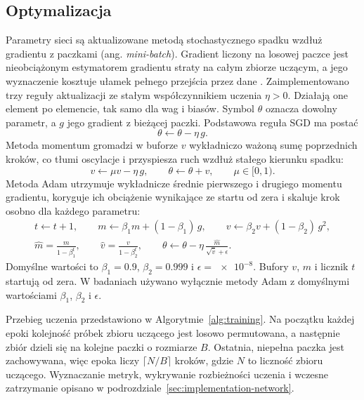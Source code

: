 \subsection{Optymalizacja}
\label{sec:mlp-optimization}

Parametry sieci są aktualizowane metodą stochastycznego spadku wzdłuż gradientu z paczkami (ang. \textit{mini-batch}). Gradient liczony na losowej paczce jest nieobciążonym estymatorem gradientu straty na całym zbiorze uczącym, a jego wyznaczenie kosztuje ułamek pełnego przejścia przez dane \cite{goodfellow2016}. Zaimplementowano trzy reguły aktualizacji ze stałym współczynnikiem uczenia $\eta > 0$. Działają one element po elemencie, tak samo dla wag i biasów. Symbol $\theta$ oznacza dowolny parametr, a $g$ jego gradient z bieżącej paczki. Podstawowa reguła SGD ma postać
\begin{equation}
    \theta \gets \theta - \eta \, g .
    \label{eq:sgd}
\end{equation}
Metoda momentum \cite{sutskever2013} gromadzi w buforze $v$ wykładniczo ważoną sumę poprzednich kroków, co tłumi oscylacje i przyspiesza ruch wzdłuż stałego kierunku spadku:
\begin{equation}
    v \gets \mu v - \eta \, g, \qquad \theta \gets \theta + v, \qquad \mu \in [0, 1).
    \label{eq:momentum}
\end{equation}
Metoda Adam \cite{kingma2015} utrzymuje wykładnicze średnie pierwszego i drugiego momentu gradientu, koryguje ich obciążenie wynikające ze startu od zera i skaluje krok osobno dla każdego parametru:
\begin{equation}
    \begin{gathered}
        t \gets t + 1, \qquad
        m \gets \beta_1 m + (1 - \beta_1) \, g, \qquad
        v \gets \beta_2 v + (1 - \beta_2) \, g^2, \\
        \hat{m} = \frac{m}{1 - \beta_1^{t}}, \qquad
        \hat{v} = \frac{v}{1 - \beta_2^{t}}, \qquad
        \theta \gets \theta - \eta \, \frac{\hat{m}}{\sqrt{\hat{v}} + \epsilon} .
    \end{gathered}
    \label{eq:adam}
\end{equation}
Domyślne wartości to $\beta_1 = \num{0.9}$, $\beta_2 = \num{0.999}$ i $\epsilon = \num{e-8}$. Bufory $v$, $m$ i licznik $t$ startują od zera. W badaniach używano wyłącznie metody Adam z domyślnymi wartościami $\beta_1$, $\beta_2$ i $\epsilon$.

Przebieg uczenia przedstawiono w Algorytmie~\ref{alg:training}. Na początku każdej epoki kolejność próbek zbioru uczącego jest losowo permutowana, a następnie zbiór dzieli się na kolejne paczki o rozmiarze $B$. Ostatnia, niepełna paczka jest zachowywana, więc epoka liczy $\lceil N / B \rceil$ kroków, gdzie $N$ to liczność zbioru uczącego. Wyznaczanie metryk, wykrywanie rozbieżności uczenia i wczesne zatrzymanie opisano w podrozdziale~\ref{sec:implementation-network}.

